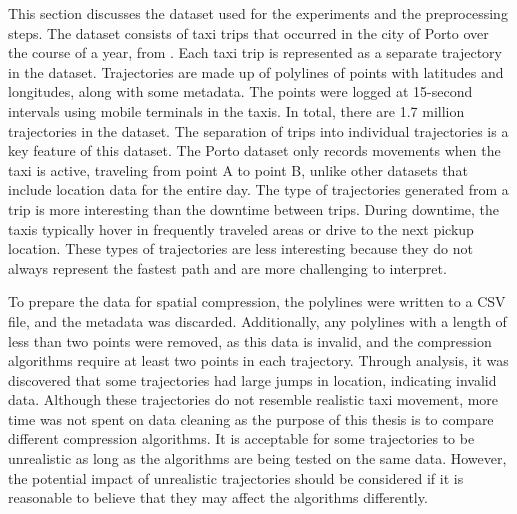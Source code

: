 This section discusses the dataset used for the experiments and the preprocessing steps. The dataset consists of taxi trips that occurred in the city of Porto over the course of a year, from \textcite{porto}. Each taxi trip is represented as a separate trajectory in the dataset. Trajectories are made up of polylines of points with latitudes and longitudes, along with some metadata. The points were logged at 15-second intervals using mobile terminals in the taxis. In total, there are 1.7 million trajectories in the dataset. The separation of trips into individual trajectories is a key feature of this dataset. The Porto dataset only records movements when the taxi is active, traveling from point A to point B, unlike other datasets that include location data for the entire day. The type of trajectories generated from a trip is more interesting than the downtime between trips. During downtime, the taxis typically hover in frequently traveled areas or drive to the next pickup location. These types of trajectories are less interesting because they do not always represent the fastest path and are more challenging to interpret.

To prepare the data for spatial compression, the polylines were written to a CSV file, and the metadata was discarded. Additionally, any polylines with a length of less than two points were removed, as this data is invalid, and the compression algorithms require at least two points in each trajectory. Through analysis, it was discovered that some trajectories had large jumps in location, indicating invalid data. Although these trajectories do not resemble realistic taxi movement, more time was not spent on data cleaning as the purpose of this thesis is to compare different compression algorithms. It is acceptable for some trajectories to be unrealistic as long as the algorithms are being tested on the same data. However, the potential impact of unrealistic trajectories should be considered if it is reasonable to believe that they may affect the algorithms differently.